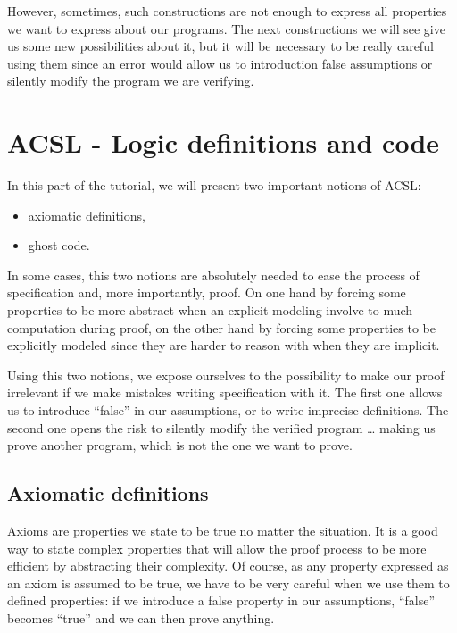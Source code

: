 \documentclass[12pt,francais,]{scrbook}
\providecommand{\tightlist}{%
  \setlength{\itemsep}{0pt}\setlength{\parskip}{0pt}}
\begin{document}
However, sometimes, such constructions are not enough to express all
properties we want to express about our programs. The next constructions
we will see give us some new possibilities about it, but it will be
necessary to be really careful using them since an error would allow us
to introduction false assumptions or silently modify the program we are
verifying.

\chapter{ACSL - Logic definitions and
code}\label{acsl---logic-definitions-and-code}

In this part of the tutorial, we will present two important notions of
ACSL:

\begin{itemize}
\tightlist
\item
  axiomatic definitions,
\item
  ghost code.
\end{itemize}

In some cases, this two notions are absolutely needed to ease the
process of specification and, more importantly, proof. On one hand by
forcing some properties to be more abstract when an explicit modeling
involve to much computation during proof, on the other hand by forcing
some properties to be explicitly modeled since they are harder to reason
with when they are implicit.

Using this two notions, we expose ourselves to the possibility to make
our proof irrelevant if we make mistakes writing specification with it.
The first one allows us to introduce ``false'' in our assumptions, or to
write imprecise definitions. The second one opens the risk to silently
modify the verified program \ldots{} making us prove another program,
which is not the one we want to prove.

\section{Axiomatic definitions}\label{axiomatic-definitions}

Axioms are properties we state to be true no matter the situation. It is
a good way to state complex properties that will allow the proof process
to be more efficient by abstracting their complexity. Of course, as any
property expressed as an axiom is assumed to be true, we have to be very
careful when we use them to defined properties: if we introduce a false
property in our assumptions, ``false'' becomes ``true'' and we can then
prove anything.
\end{document}

